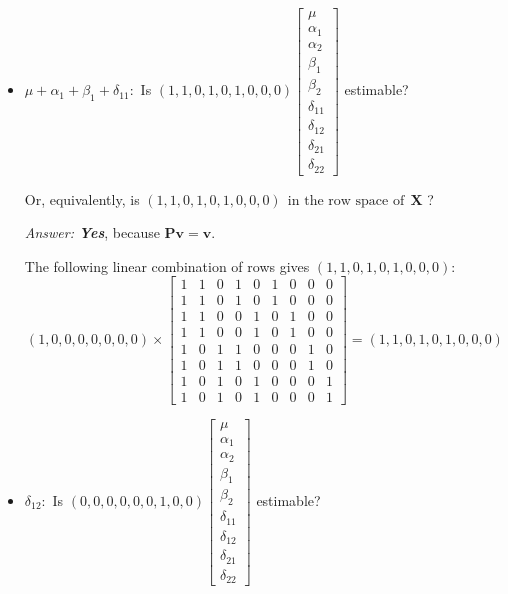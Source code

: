 \documentclass[paper=a4, fontsize=11pt]{scrartcl} %
\newcommand{\matP}{\mathbf{P}}
\newcommand{\matX}{\mathbf{X}}
\begin{document}
\begin{enumerate}[(a)]
\begin{itemize}
\item $\mu + \alpha_1 + \beta_1 + \delta_{11}:$ 
Is $
(1, 1, 0, 1, 0, 1, 0, 0, 0)
\begin{bmatrix} 
\mu \\ \alpha_1\\ \alpha_2 \\ \beta_1 \\ \beta_2 \\ \delta_{11} \\ \delta_{12} \\ \delta_{21} \\ \delta_{22} 
\end{bmatrix}
$ estimable? 

\bigskip
Or, equivalently, is $(1, 1, 0, 1, 0, 1, 0, 0, 0) \ \ \text{in the row space of} \ \  \matX $ ?  

\bigskip
\begin{center}
\emph{Answer: \bf{Yes}}, because $\matP \mathbf{v} = \mathbf{v.}$
\end{center}
The following linear combination of rows gives $(1, 1, 0, 1, 0, 1, 0, 0, 0) $:
$$
(1, 0, 0, 0, 0, 0, 0, 0) \times 
\begin{bmatrix} 1 & 1 & 0 & 1 & 0 & 1 & 0 & 0 & 0 \\1 & 1 & 0 & 1 & 0 & 1 & 0 & 0 & 0\\1 & 1 & 0 & 0 & 1 & 0 & 1 & 0 & 0\\1 & 1 & 0 & 0 & 1  & 0 & 1 & 0 & 0\\1 & 0 & 1 & 1 & 0 & 0 & 0 & 1 & 0\\1 & 0 & 1 & 1 & 0 & 0 & 0 & 1 & 0\\1 & 0 & 1 & 0 & 1 & 0 & 0 & 0 & 1\\1 & 0 & 1 & 0 & 1 & 0 & 0 & 0 & 1\end{bmatrix}
=
(1, 1, 0, 1, 0, 1, 0, 0, 0)
$$
\bigskip

\item $\delta_{12}:$ 
Is $(0, 0, 0, 0, 0, 0, 1, 0, 0) 
\begin{bmatrix} 
\mu \\ \alpha_1\\ \alpha_2 \\ \beta_1 \\ \beta_2 \\ \delta_{11} \\ \delta_{12} \\ \delta_{21} \\ \delta_{22} 
\end{bmatrix}
$ estimable? 


\end{itemize}
\end{enumerate}
\end{document}
